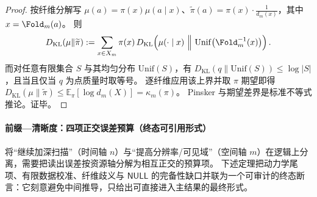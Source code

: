 \begin{proof}
按纤维分解写 \(\mu(a)=\pi(x)\mu(a\mid x)\)、\(\widetilde\pi(a)=\pi(x)\cdot \frac{1}{d_m(x)}\)，其中 \(x=\Fold_m(a)\)。
则
\[
D_{\mathrm{KL}}(\mu\|\widetilde\pi)
:=\sum_{x\in X_m}\pi(x)\,D_{\mathrm{KL}}\!\left(\mu(\cdot\mid x)\ \Big\|\ \mathrm{Unif}\big(\Fold_m^{-1}(x)\big)\right).
\]
而对任意有限集合 \(S\) 与其均匀分布 \(\mathrm{Unif}(S)\)，有 \(D_{\mathrm{KL}}(q\|\mathrm{Unif}(S))\le \log|S|\)，且当且仅当 \(q\) 为点质量时取等号。
逐纤维应用该上界并取 \(\pi\) 期望即得 \(D_{\mathrm{KL}}(\mu\|\widetilde\pi)\le \mathbb{E}_\pi[\log d_m(X)]=\kappa_m(\pi)\)。
Pinsker 与期望差界是标准不等式推论。证毕。
\end{proof}



\paragraph{前缀—清晰度：四项正交误差预算（终态可引用形式）}
将“继续加深扫描”（时间轴 \(n\)）与“提高分辨率/可见域”（空间轴 \(m\)）在逻辑上分离，需要把读出误差按资源轴分解为相互正交的预算项。
下述定理把动力学尾项、有限数据校准、纤维歧义与 \(\mathsf{NULL}\) 的完备性缺口并联为一个可审计的终态断言：它刻意避免中间推导，只给出可直接进入主结果的最终形式。


